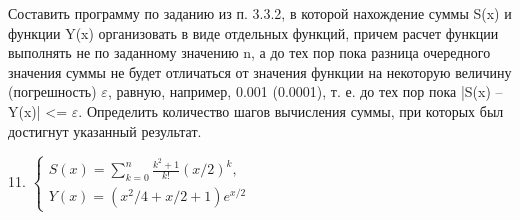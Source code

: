 Составить программу по заданию из п. 3.3.2, в которой нахождение суммы 
S(x) и функции Y(x) организовать в виде отдельных функций, причем расчет
функции выполнять не по заданному значению n, а до тех пор пока разница
очередного значения суммы не будет отличаться от значения функции на 
некоторую величину (погрешность) $\varepsilon$, равную, например, 0.001 (0.0001), 
т. е. до тех пор пока |S(x) – Y(x)| <= $\varepsilon$. Определить количество шагов
вычисления суммы, при которых был достигнут указанный результат.

11.
$ 
	\begin{cases}
	S(x) = \sum_{k = 0}^{n}{\frac{k^2 + 1}{k!}(x/2)^k}, \\
	Y(x) = (x^2 / 4 + x / 2 + 1)e^{x/2}
	\end{cases}
$
